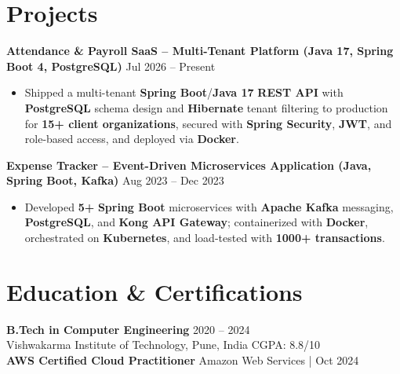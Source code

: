 \documentclass[a4paper,10pt]{article}
\begin{document}
\section*{Projects}

\textbf{Attendance \& Payroll SaaS -- Multi-Tenant Platform (Java 17, Spring Boot 4, PostgreSQL)} \hfill Jul 2026 -- Present
\begin{itemize}[leftmargin=*]
    \item Shipped a multi-tenant \textbf{Spring Boot}/\textbf{Java 17} \textbf{REST API} with \textbf{PostgreSQL} schema design and \textbf{Hibernate} tenant filtering to production for \textbf{15+ client organizations}, secured with \textbf{Spring Security}, \textbf{JWT}, and role-based access, and deployed via \textbf{Docker}.
\end{itemize}

\textbf{Expense Tracker -- Event-Driven Microservices Application (Java, Spring Boot, Kafka)} \hfill Aug 2023 -- Dec 2023
\begin{itemize}[leftmargin=*]
    \item Developed \textbf{5+} \textbf{Spring Boot} microservices with \textbf{Apache Kafka} messaging, \textbf{PostgreSQL}, and \textbf{Kong API Gateway}; containerized with \textbf{Docker}, orchestrated on \textbf{Kubernetes}, and load-tested with \textbf{1000+ transactions}.
\end{itemize}

\section*{Education \& Certifications}
\textbf{B.Tech in Computer Engineering} \hfill 2020 -- 2024 \\
Vishwakarma Institute of Technology, Pune, India \hfill CGPA: 8.8/10 \\
\textbf{AWS Certified Cloud Practitioner} \hfill Amazon Web Services \;|\; Oct 2024
\end{document}

